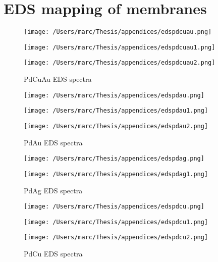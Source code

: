\section*{EDS mapping of membranes}
\begin{figure}[H]
  \texttt{[image: /Users/marc/Thesis/appendices/edspdcuau.png]}
\end{figure}

\begin{figure}[H]
  \texttt{[image: /Users/marc/Thesis/appendices/edspdcuau1.png]}
\end{figure}

\begin{figure}[H]
  \texttt{[image: /Users/marc/Thesis/appendices/edspdcuau2.png]}
  \caption{PdCuAu EDS spectra}
\end{figure}


\begin{figure}[H]
  \texttt{[image: /Users/marc/Thesis/appendices/edspdau.png]}
\end{figure}
\begin{figure}[H]
  \texttt{[image: /Users/marc/Thesis/appendices/edspdau1.png]}
\end{figure}

\begin{figure}[H]
  \texttt{[image: /Users/marc/Thesis/appendices/edspdau2.png]}
  \caption{PdAu EDS spectra}
\end{figure}

\begin{figure}[H]
  \texttt{[image: /Users/marc/Thesis/appendices/edspdag.png]}
\end{figure}

\begin{figure}[H]
  \texttt{[image: /Users/marc/Thesis/appendices/edspdag1.png]}
  \caption{PdAg EDS spectra}
\end{figure}

\begin{figure}[H]
  \texttt{[image: /Users/marc/Thesis/appendices/edspdcu.png]}
\end{figure}
\begin{figure}[H]
  \texttt{[image: /Users/marc/Thesis/appendices/edspdcu1.png]}
\end{figure}

\begin{figure}[H]
  \texttt{[image: /Users/marc/Thesis/appendices/edspdcu2.png]}
  \caption{PdCu EDS spectra}
\end{figure}

